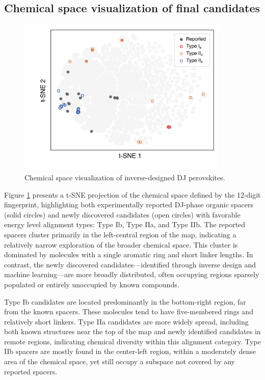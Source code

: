 \clearpage
\subsection{Chemical space visualization of final candidates}

\begin{figure}[htbp]
    \centering
    \includegraphics[width=0.9\textwidth]{figures/synthesis-feasibility/figure5-26.png}
    \caption{Chemical space visualization of inverse-designed DJ perovskites.}
    \label{fig:figure5.26}
\end{figure}

Figure \ref{fig:figure5.26} presents a t-SNE projection of the chemical space defined by the 12-digit fingerprint, highlighting both experimentally reported DJ-phase organic spacers (solid circles) and newly discovered candidates (open circles) with favorable energy level alignment types: Type Ib, Type IIa, and Type IIb. The reported spacers cluster primarily in the left-central region of the map, indicating a relatively narrow exploration of the broader chemical space. This cluster is dominated by molecules with a single aromatic ring and short linker lengths. In contrast, the newly discovered candidates—identified through inverse design and machine learning—are more broadly distributed, often occupying regions sparsely populated or entirely unoccupied by known compounds.

Type Ib candidates are located predominantly in the bottom-right region, far from the known spacers. These molecules tend to have five-membered rings and relatively short linkers. Type IIa candidates are more widely spread, including both known structures near the top of the map and newly identified candidates in remote regions, indicating chemical diversity within this alignment category. Type IIb spacers are mostly found in the center-left region, within a moderately dense area of the chemical space, yet still occupy a subspace not covered by any reported spacers.

